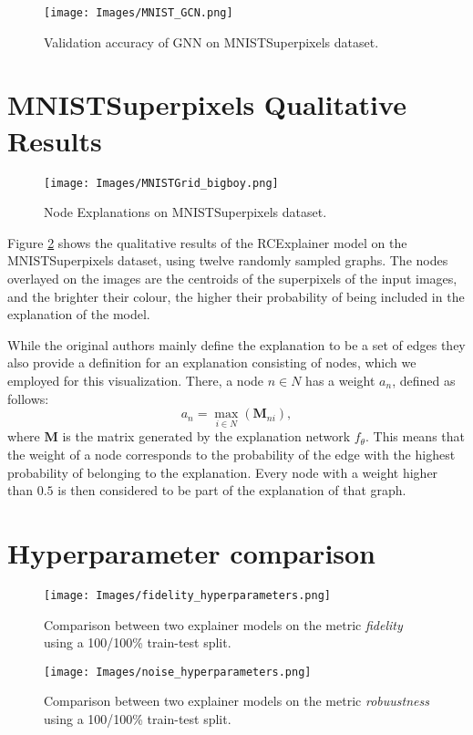 \begin{figure}[!htbp]
    \centerline{\texttt{[image: Images/MNIST\_GCN.png]}}
    \caption{Validation accuracy of GNN on MNISTSuperpixels dataset.}
    \label{fig:MNIST_training_GNN}
\end{figure}

\newpage
\section{MNISTSuperpixels Qualitative Results}
\begin{figure}[!htbp]
    \centerline{\texttt{[image: Images/MNISTGrid\_bigboy.png]}}
    \caption{Node Explanations on MNISTSuperpixels dataset.}
    \label{fig:qual_MNIST}
\end{figure}

Figure \ref{fig:qual_MNIST} shows the qualitative results of the RCExplainer model on the MNISTSuperpixels dataset, using twelve randomly sampled graphs. The nodes overlayed on the images are the centroids of the superpixels of the input images, and the brighter their colour, the higher their probability of being included in the explanation of the model.

\noindent While the original authors mainly define the explanation to be a set of edges they also provide a definition for an explanation consisting of nodes, which we employed for this visualization. There, a node $n \in N$ has a weight $a_{n}$, defined as follows:
\begin{equation}
    a_{n} = \max_{i \in N}(\textbf{M}_{ni}),
\end{equation}
where $\textbf{M}$ is the matrix generated by the explanation network $f_{\theta}$. This means that the weight of a node corresponds to the probability of the edge with the highest probability of belonging to the explanation. Every node with a weight higher than $0.5$ is then considered to be part of the explanation of that graph.

\newpage

\section{Hyperparameter comparison} \label{appendix:hyperparameters}

\begin{figure}[h!]
    \centering
    \texttt{[image: Images/fidelity\_hyperparameters.png]}
    \caption{Comparison between two explainer models on the metric \textit{fidelity} using a 100/100\% train-test split.}
\end{figure}

\begin{figure}[h!]
    \centering
    \texttt{[image: Images/noise\_hyperparameters.png]}
    \caption{Comparison between two explainer models on the metric \textit{robuustness} using a 100/100\% train-test split.}
\end{figure}

